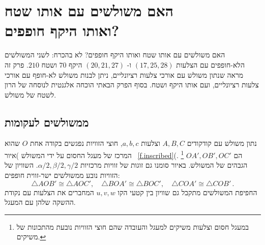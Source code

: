 


\chapter[\R{האם משולשים עם אותו שטח ואותו היקף חופפים?}]{האם משולשים עם אותו שטח\\
ואותו היקף חופפים?}
\label{c.congruent}


האם משולשים עם אותו שטח ואותו היקף חופפים? לא בהכרח: לשני המשולשים הלא-חופפים עם הצלעות
$(17,25,28)$
ו-%
$(20,21,27)$
היקף
$70$
ושטח 
$210$.
פרק זה מראה שנתון משולש עם אורכי צלעות רציונליים, ניתן לבנות משולש לא-חופף עם אורכי צלעות רציונליים, ועם אותו היקף ושטח.
בסוף הפרק הבאתי הוכחה אלגנטית לנוסחה של הרון לשטח של משולש.




\section{ממשולשים לעקומות}

נתון משולש עם קודקודים
$A,B,C$
וצלעות
$a,b,c$,
חוצי הזוויות נפגשים בקודה אחת
$O$
שהוא המרכז של מעגל החסום על ידי המשולש )איור~%
\ref{f.inscribed}(.%
\footnote{במעגל חסום וצלעות משיקים למעגל והעובדה שהם חוצי הזוויות נובעת מהתכונות של משיקים.}
$OA',OB',OC'$
הם הגבהים של המשולש. באיור סומנו גם זוגות של זוויות מרכזיות
$\alpha/2,\beta/2,\gamma/2$.
השוויון של הזוויות נובע ממשולשים ישר-זווית חופפים:
\[
\triangle AOB'\cong \triangle AOC',\quad \triangle BOA'\cong \triangle BOC', \quad \triangle COA'\cong \triangle COB'\,.
\]
החפיפת המשולשים מתקבל גם שוויון בין קטעי הקו 
$u,v,w$
המחברים את הצלעות עם נקודת ההשקה שלהן עם המעגל.



